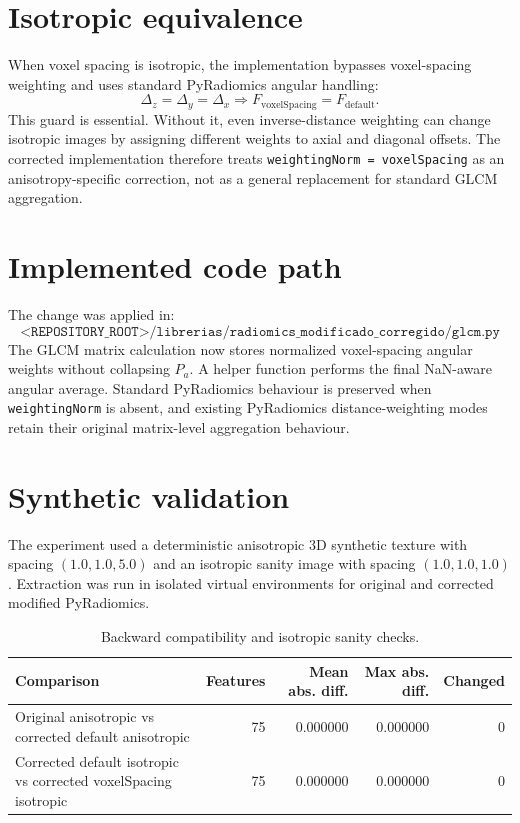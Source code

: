 \documentclass[11pt,a4paper]{article}
\begin{document}
\section*{Isotropic equivalence}
When voxel spacing is isotropic, the implementation bypasses voxel-spacing weighting and uses standard PyRadiomics angular handling:
\[
  \Delta_z=\Delta_y=\Delta_x \Rightarrow F_{\mathrm{voxelSpacing}} = F_{\mathrm{default}}.
\]
This guard is essential. Without it, even inverse-distance weighting can change isotropic images by assigning different weights to axial and diagonal offsets. The corrected implementation therefore treats \texttt{weightingNorm = voxelSpacing} as an anisotropy-specific correction, not as a general replacement for standard GLCM aggregation.

\section*{Implemented code path}
The change was applied in:
\[
\texttt{<REPOSITORY_ROOT>/librerias/radiomics\_modificado\_corregido/glcm.py}
\]
The GLCM matrix calculation now stores normalized voxel-spacing angular weights without collapsing \(P_a\). A helper function performs the final NaN-aware angular average. Standard PyRadiomics behaviour is preserved when \texttt{weightingNorm} is absent, and existing PyRadiomics distance-weighting modes retain their original matrix-level aggregation behaviour.

\section*{Synthetic validation}
The experiment used a deterministic anisotropic 3D synthetic texture with spacing \((1.0,1.0,5.0)\) and an isotropic sanity image with spacing \((1.0,1.0,1.0)\). Extraction was run in isolated virtual environments for original and corrected modified PyRadiomics.

\begin{table}[h]
\centering
\caption{Backward compatibility and isotropic sanity checks.}
\begin{tabular}{lrrrr}
\toprule
Comparison & Features & Mean abs. diff. & Max abs. diff. & Changed \\
\midrule
Original anisotropic vs corrected default anisotropic & 75 & 0.000000 & 0.000000 & 0 \\
Corrected default isotropic vs corrected voxelSpacing isotropic & 75 & 0.000000 & 0.000000 & 0 \\
\bottomrule
\end{tabular}
\end{table}
\end{document}
